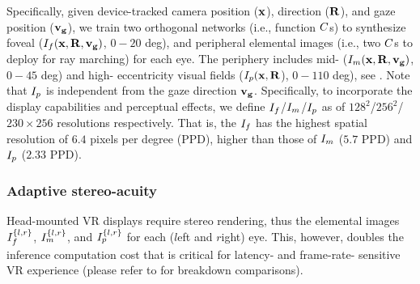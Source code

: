 Specifically, given device-tracked camera position ($\mathbf{x}$), direction ($\mathbf{R}$), and gaze position ($\mathbf{\mathbf{v}_g}$),
we train two orthogonal networks (i.e., function $C$s) to synthesize foveal ($I_{f}(\mathbf{x},\mathbf{R},\mathbf{\mathbf{v}_g})$, $0-20$ deg), and peripheral elemental images (i.e., two $C$s to deploy for ray marching) for each eye. 
The periphery includes mid- ($I_{m}(\mathbf{x},\mathbf{R},\mathbf{\mathbf{v}_g})$, $0-45$ deg) and high- eccentricity visual fields ($I_{p}(\mathbf{x},\mathbf{R}$), $0-110$ deg), see .
Note that $I_{p}$ is independent from the gaze direction $\mathbf{\mathbf{v}_g}$. 
Specifically, to incorporate the display capabilities and perceptual effects, we define $I_{f}$/$I_{m}$/$I_{p}$ as of $128^2$/$256^2$/$230\times256$ resolutions respectively.
That is, the $I_{f}$ has the highest spatial resolution of $6.4$ pixels per degree (PPD), higher than those of $I_{m}$ ($5.7$ PPD) and $I_{p}$ ($2.33$ PPD).

\subsubsection{Adaptive stereo-acuity}
Head-mounted VR displays require stereo rendering, thus the elemental images $I_{f}^{\{l,r\}}$, $I_{m}^{\{l,r\}}$, and $I_{p}^{\{l,r\}}$ for each ($l$eft and $r$ight) eye. This, however, doubles the inference computation cost that is critical for latency- and frame-rate- sensitive VR experience 
(please refer to  for breakdown comparisons).

